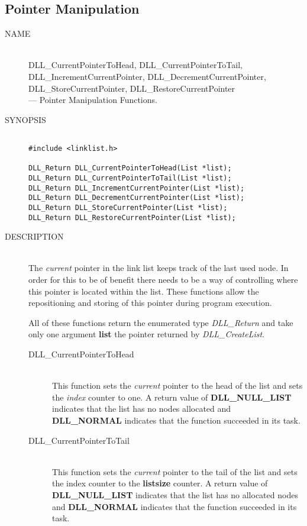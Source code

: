 \documentclass[10pt,letterpaper,titlepage]{article}
\begin{document}
\subsection{Pointer Manipulation}
\begin{description}
\item[NAME]\quad\\
DLL\_CurrentPointerToHead, DLL\_CurrentPointerToTail,\\
DLL\_IncrementCurrentPointer, DLL\_DecrementCurrentPointer,\\
DLL\_StoreCurrentPointer, DLL\_RestoreCurrentPointer\\
  --- Pointer Manipulation Functions.

\item[SYNOPSIS]
\begin{verbatim}

#include <linklist.h>

DLL_Return DLL_CurrentPointerToHead(List *list);
DLL_Return DLL_CurrentPointerToTail(List *list);
DLL_Return DLL_IncrementCurrentPointer(List *list);
DLL_Return DLL_DecrementCurrentPointer(List *list);
DLL_Return DLL_StoreCurrentPointer(List *list);
DLL_Return DLL_RestoreCurrentPointer(List *list);
\end{verbatim}

\item[DESCRIPTION]\quad\\
The \emph{current} pointer in the link list keeps track of the last used node.  In order for this to be of benefit there needs to be a way of controlling where this pointer is located within the list.  These functions allow the repositioning and storing of this pointer during program execution.
\vspace{8pt}

\noindent
All of these functions return the enumerated type \emph{DLL\_Return} and take only one argument \textbf{list} the pointer returned by \emph{DLL\_CreateList}.

 \begin{description}
 \item[DLL\_CurrentPointerToHead]\quad\\
 This function sets the \emph{current} pointer to the head of the list and sets the \emph{index} counter to one.  A return value of \textbf{DLL\_NULL\_LIST} indicates that the list has no nodes allocated and \textbf{DLL\_NORMAL} indicates that the function succeeded in its task.

 \item[DLL\_CurrentPointerToTail]\quad\\
 This function sets the \emph{current} pointer to the tail of the list and sets the index counter to the \textbf{listsize} counter.  A return value of \textbf{DLL\_NULL\_LIST} indicates that the list has no allocated nodes and \textbf{DLL\_NORMAL} indicates that the function succeeded in its task.


\end{description}
\end{description}
\end{document}
